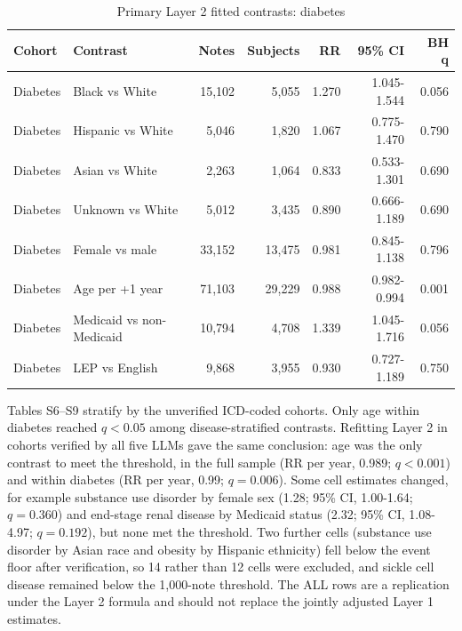 \documentclass[unnumsec,webpdf,contemporary,large]{oup-authoring-template}
\begin{document}
\begin{table}[H]
\caption{Primary Layer 2 fitted contrasts: diabetes}
\label{tab:s_layer2d}
\centering
\small
\begin{tabular}{llrrrrr}
\toprule
Cohort & Contrast & Notes & Subjects & RR & 95\% CI & BH q \\
\midrule
Diabetes & Black vs White & 15,102 & 5,055 & 1.270 & 1.045-1.544 & 0.056 \\
Diabetes & Hispanic vs White & 5,046 & 1,820 & 1.067 & 0.775-1.470 & 0.790 \\
Diabetes & Asian vs White & 2,263 & 1,064 & 0.833 & 0.533-1.301 & 0.690 \\
Diabetes & Unknown vs White & 5,012 & 3,435 & 0.890 & 0.666-1.189 & 0.690 \\
Diabetes & Female vs male & 33,152 & 13,475 & 0.981 & 0.845-1.138 & 0.796 \\
Diabetes & Age per +1 year & 71,103 & 29,229 & 0.988 & 0.982-0.994 & 0.001 \\
Diabetes & Medicaid vs non-Medicaid & 10,794 & 4,708 & 1.339 & 1.045-1.716 & 0.056 \\
Diabetes & LEP vs English & 9,868 & 3,955 & 0.930 & 0.727-1.189 & 0.750 \\
\bottomrule
\end{tabular}
\end{table}

Tables S6--S9 stratify by the unverified ICD-coded cohorts. Only age within diabetes reached \(q<0.05\) among disease-stratified contrasts. Refitting Layer 2 in cohorts verified by all five LLMs gave the same conclusion: age was the only contrast to meet the threshold, in the full sample (RR per year, 0.989; $q<0.001$) and within diabetes (RR per year, 0.99; $q=0.006$). Some cell estimates changed, for example substance use disorder by female sex (1.28; 95\% CI, 1.00-1.64; $q=0.360$) and end-stage renal disease by Medicaid status (2.32; 95\% CI, 1.08-4.97; $q=0.192$), but none met the threshold. Two further cells (substance use disorder by Asian race and obesity by Hispanic ethnicity) fell below the event floor after verification, so 14 rather than 12 cells were excluded, and sickle cell disease remained below the 1,000-note threshold. The ALL rows are a replication under the Layer 2 formula and should not replace the jointly adjusted Layer 1 estimates.
\end{document}
